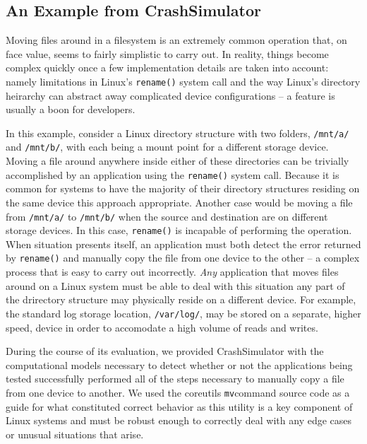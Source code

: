     \subsection{An Example from CrashSimulator}

    Moving files around in a filesystem is an extremely common operation that, on face value, seems to fairly simplistic
    to carry out.  In reality, things become complex quickly once a few implementation details are taken into account:
    namely limitations in Linux's {\tt rename()} system call and the way Linux's directory heirarchy can abstract away
    complicated device configurations -- a feature is usually a boon for developers.

    In this example, consider a Linux directory structure with two folders, {\tt /mnt/a/} and {\tt /mnt/b/}, with each
    being a mount point for a different storage device.  Moving a file around anywhere inside either of these
    directories can be trivially accomplished by an application using the {\tt rename()} system call.  Because it is
    common for systems to have the majority of their directory structures residing on the same device this approach
    appropriate.  Another case would be moving a file from {\tt /mnt/a/} to {\tt /mnt/b/} when the source and destination are on
    different storage devices.  In this case, {\tt rename()} is incapable of performing the operation.  When situation
    presents itself, an application must both detect the error returned by {\tt rename()} and manually copy the file from one
    device to the other -- a complex process that is easy to carry out incorrectly.  \emph{Any} application that moves
    files around on a Linux system must be able to deal with this situation any part of the drirectory structure may
    physically reside on a different device.  For example, the standard log storage location, {\tt /var/log/}, may be stored
    on a separate, higher speed, device in order to accomodate a high volume of reads and writes.

    During the course of its evaluation, we provided CrashSimulator with the computational models necessary to detect
    whether or not the applications being tested successfully performed all of the steps necessary to manually copy a
    file from one device to another.  We used the coreutils {\tt mv}command source code as a guide for what constituted
    correct behavior as this utility is a key component of Linux systems and must be robust enough to correctly deal
    with any edge cases or unusual situations that arise.

